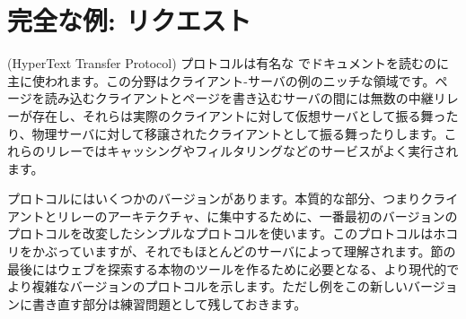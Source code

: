 \section{完全な例: {\normalfont \http} リクエスト}

\http (HyperText Transfer Protocol) プロトコルは有名な  でドキュメントを読むのに主に使われます。この分野はクライアント-サーバの例のニッチな領域です。ページを読み込むクライアントとページを書き込むサーバの間には無数の中継リレーが存在し、それらは実際のクライアントに対して仮想サーバとして振る舞ったり、物理サーバに対して移譲されたクライアントとして振る舞ったりします。これらのリレーではキャッシングやフィルタリングなどのサービスがよく実行されます。

\http プロトコルにはいくつかのバージョンがあります。本質的な部分、つまりクライアントとリレーのアーキテクチャ、に集中するために、一番最初のバージョンの \http プロトコルを改変したシンプルなプロトコルを使います。このプロトコルはホコリをかぶっていますが、それでもほとんどのサーバによって理解されます。節の最後にはウェブを探索する本物のツールを作るために必要となる、より現代的でより複雑なバージョンのプロトコルを示します。ただし例をこの新しいバージョンに書き直す部分は練習問題として残しておきます。


